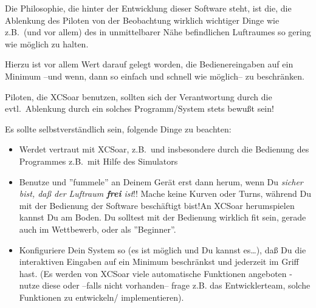 Die Philosophie, die hinter der Entwicklung dieser Software steht, ist die, die Ablenkung des Piloten von der Beobachtung wirklich wichtiger Dinge
wie z.B.\ (und vor allem) des in unmittelbarer Nähe befindlichen Luftraumes so gering wie möglich zu halten.

Hierzu ist vor allem Wert darauf gelegt worden, die Bedienereingaben auf ein Minimum --und wenn, dann so einfach und 
schnell wie möglich-- zu beschränken. 
 
Piloten, die  \textsf{XCSoar} benutzen, sollten sich der Verantwortung durch die evtl.\ Ablenkung durch ein solches Programm/System stets bewußt sein!

Es sollte selbstverständlich sein, folgende Dinge zu beachten:
\begin{itemize}
\item Werdet vertraut mit \textsf{XCSoar}, z.B.\ und insbesondere durch die Bedienung des Programmes z.B.\ mit Hilfe des Simulators
\item Benutze und ''fummele'' an Deinem Gerät erst dann herum, wenn Du {\sl sicher bist, daß der Luftraum {\bf frei} ist}!! 
Mache keine Kurven oder Turns, während Du mit der Bedienung der Software beschäftigt bist!An \textsf{XCSoar} herumspielen kannst Du am Boden. 
Du solltest mit der Bedienung wirklich fit sein, gerade auch im Wettbewerb, oder als ''Beginner''.
\item Konfiguriere Dein System so (es ist möglich und Du kannst es\dots), daß Du die interaktiven Eingaben auf ein Minimum beschränkst und 
jederzeit im Griff hast. (Es werden von \textsf{XCSoar} viele automatische Funktionen angeboten - nutze diese oder --falls nicht vorhanden-- 
frage z.B. das Entwicklerteam,  solche Funktionen zu entwickeln/ implementieren).   
\end{itemize}
